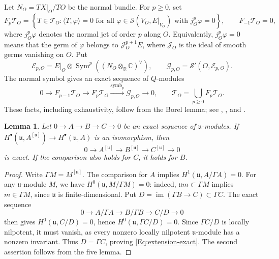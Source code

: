 \documentclass[a4paper,12pt]{amsart}
\numberwithin{equation}{section}
\theoremstyle{plain}
\newtheorem{lemma}[theorem]{Lemma}
\theoremstyle{definition}
\theoremstyle{remark}
\begin{document}
Let $N_O=TX|_O/TO$ be the normal bundle.
For $p\geq0$, set
\[
F_p\mathcal T_O
=\left\{T\in\mathcal T_O:
\langle T,\varphi\rangle=0\text{ for all }\varphi\in\mathcal S(V_O,E|_{V_O})
\text{ with }j_O^p\varphi=0\right\},
\qquad F_{-1}\mathcal T_O=0,
\]
where $j_O^p\varphi$ denotes the normal jet of order $p$ along $O$.
Equivalently, $j_O^p\varphi=0$ means that the germ of $\varphi$ belongs to $\mathcal J_O^{p+1}E$, where $\mathcal J_O$ is the ideal of smooth germs vanishing on $O$.
Put
\[
\mathcal E_{p,O}
=E|_O\otimes\operatorname{Sym}^p((N_O\otimes_{\mathbb R}\mathbb C)^\vee),
\qquad
\mathcal G_{p,O}=\mathcal S'(O,\mathcal E_{p,O}).
\]
The normal symbol gives an exact sequence of $Q$-modules
\begin{equation}\label{Eq:normal-ordinary}
 0\longrightarrow F_{p-1}\mathcal T_O
 \longrightarrow F_p\mathcal T_O
 \xrightarrow{\operatorname{symb}_p}\mathcal G_{p,O}
 \longrightarrow0,\qquad
 \mathcal T_O=\bigcup_{p\geq0}F_p\mathcal T_O.
\end{equation}
These facts, including exhaustivity, follow from the Borel lemma; see \cite[Lemma~5.5.3 and Corollary~5.5.4]{AG08}, \cite[Propositions~8.2--8.3]{CS21}, and \cite[Section~2]{Casselman-Hecht-Milicic}.

\begin{lemma}\label{L:comparison-extension}
Let $0\to A\to B\to C\to0$ be an exact sequence of $\mathfrak u$-modules.
If $H^\bullet(\mathfrak u,A^{[\mathfrak u]})\to H^\bullet(\mathfrak u,A)$ is an isomorphism, then
\begin{equation}\label{Eq:extension-exact}
 0\longrightarrow A^{[\mathfrak u]}
 \longrightarrow B^{[\mathfrak u]}
 \longrightarrow C^{[\mathfrak u]}\longrightarrow0
\end{equation}
is exact.
If the comparison also holds for $C$, it holds for $B$.
\end{lemma}

\begin{proof}
Write $\Gamma M=M^{[\mathfrak u]}$.
The comparison for $A$ implies $H^1(\mathfrak u,A/\Gamma A)=0$.
For any $\mathfrak u$-module $M$, we have $H^0(\mathfrak u,M/\Gamma M)=0$: indeed, $\mathfrak u m\subset\Gamma M$ implies $m\in\Gamma M$, since $\mathfrak u$ is finite-dimensional.
Put $D=\operatorname{im}(\Gamma B\to C)\subset\Gamma C$.
The exact sequence
\[
0\longrightarrow A/\Gamma A
\longrightarrow B/\Gamma B
\longrightarrow C/D\longrightarrow0
\]
then gives $H^0(\mathfrak u,C/D)=0$, hence $H^0(\mathfrak u,\Gamma C/D)=0$.
Since $\Gamma C/D$ is locally nilpotent, it must vanish, as every nonzero locally nilpotent $\mathfrak u$-module has a nonzero invariant.
Thus $D=\Gamma C$, proving \eqref{Eq:extension-exact}.
The second assertion follows from the five lemma.
\end{proof}
\end{document}
